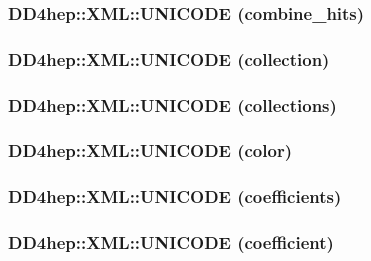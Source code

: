 \hypertarget{namespace_d_d4hep_1_1_x_m_l_afcba8763ae22bcb136e542df4a675961}{
\subsubsection[{UNICODE}]{\setlength{\rightskip}{0pt plus 5cm}DD4hep::XML::UNICODE (combine\_\-hits)}}
\label{namespace_d_d4hep_1_1_x_m_l_afcba8763ae22bcb136e542df4a675961}
\hypertarget{namespace_d_d4hep_1_1_x_m_l_a81a5be6fb130ad33fc6d9de6167a164b}{
\subsubsection[{UNICODE}]{\setlength{\rightskip}{0pt plus 5cm}DD4hep::XML::UNICODE (collection)}}
\label{namespace_d_d4hep_1_1_x_m_l_a81a5be6fb130ad33fc6d9de6167a164b}
\hypertarget{namespace_d_d4hep_1_1_x_m_l_a126c380ca9d4874360e355444af84a16}{
\subsubsection[{UNICODE}]{\setlength{\rightskip}{0pt plus 5cm}DD4hep::XML::UNICODE (collections)}}
\label{namespace_d_d4hep_1_1_x_m_l_a126c380ca9d4874360e355444af84a16}
\hypertarget{namespace_d_d4hep_1_1_x_m_l_a6824b3eb8b25483b4378bfec45dc4c43}{
\subsubsection[{UNICODE}]{\setlength{\rightskip}{0pt plus 5cm}DD4hep::XML::UNICODE (color)}}
\label{namespace_d_d4hep_1_1_x_m_l_a6824b3eb8b25483b4378bfec45dc4c43}
\hypertarget{namespace_d_d4hep_1_1_x_m_l_a85267280422f2a419836796e52ee004c}{
\subsubsection[{UNICODE}]{\setlength{\rightskip}{0pt plus 5cm}DD4hep::XML::UNICODE (coefficients)}}
\label{namespace_d_d4hep_1_1_x_m_l_a85267280422f2a419836796e52ee004c}
\hypertarget{namespace_d_d4hep_1_1_x_m_l_abcd7b7f159f83d6bc4b58e541fe93e65}{
\subsubsection[{UNICODE}]{\setlength{\rightskip}{0pt plus 5cm}DD4hep::XML::UNICODE (coefficient)}}
